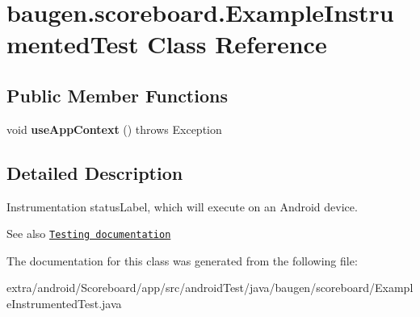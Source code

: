 \hypertarget{classbaugen_1_1scoreboard_1_1_example_instrumented_test}{}\section{baugen.\+scoreboard.\+Example\+Instrumented\+Test Class Reference}
\label{classbaugen_1_1scoreboard_1_1_example_instrumented_test}
\subsection*{Public Member Functions}
\begin{DoxyCompactItemize}
\item 
\hypertarget{classbaugen_1_1scoreboard_1_1_example_instrumented_test_a468c0a773ca697e0e1bacaa20b36da5c}{}\label{classbaugen_1_1scoreboard_1_1_example_instrumented_test_a468c0a773ca697e0e1bacaa20b36da5c} 
void {\bfseries use\+App\+Context} ()  throws Exception 
\end{DoxyCompactItemize}


\subsection{Detailed Description}
Instrumentation status\+Label, which will execute on an Android device.

\begin{DoxySeeAlso}{See also}
\href{http://d.android.com/tools/testing}{\tt Testing documentation} 
\end{DoxySeeAlso}


The documentation for this class was generated from the following file\+:\begin{DoxyCompactItemize}
\item 
extra/android/\+Scoreboard/app/src/android\+Test/java/baugen/scoreboard/Example\+Instrumented\+Test.\+java\end{DoxyCompactItemize}
